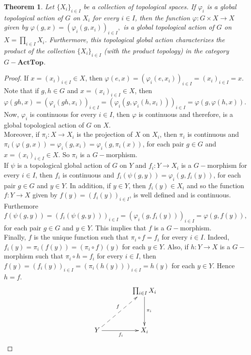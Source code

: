 \documentclass[sn-mathphys-num]{sn-jnl}%
\theoremstyle{thmstyleone}%
\newtheorem{theorem}{Theorem}%
\theoremstyle{thmstyletwo}%
\theoremstyle{thmstylethree}%
\begin{document}
\begin{theorem}\label{proglo}
Let $ \{X_i \}_{i \in I} $ be a collection of topological spaces. If $ \varphi_i $ is a global topological action of $ G $ on $ X_i $ for every $i\in I$, then the function $ \varphi: G \times X \to X $ given by $ \varphi (g, x) = (\varphi_i (g , x_i))_{i \in I},$ is a global topological action of $ G $ on $ X = \prod_{i \in I} X_i $. Furthermore, this topological global action characterizes the product of the collection $ \{X_i \}_{i \in I} $ (with the product topology) in the category $ G- \mathbf{ActTop}$.
\end{theorem}
\begin{proof}
If $ x = (x_i)_{i \in I} \in X $, then $ \varphi (e, x) = (\varphi_i(e, x_i ))_{i \in I} = (x_i)_{ i \in I} = x.$ Note that if $ g, h \in G $ and $ x = (x_i)_{ i \in I} \in X $, then $ \varphi (gh, x) = (\varphi_i (gh, x_i))_{i \in I} = (\varphi_i (g, \varphi_i (h, x_i)))_{i \in I} = \varphi (g, \varphi (h, x)) $.  Now, $\varphi_i$ is continuous for every $ i \in I $, then $ \varphi $ is continuous and therefore, is a global topological action of $ G $ on $ X $. \\

Moreover, if $ \pi_i: X \to X_i $ is the projection of $ X $ on $ X_i $, then $\pi_i$ is continuous and $ \pi_i (\varphi (g, x)) = \varphi_i(g, x_i) = \varphi_i(g, \pi_i (x)) $, for each pair $ g \in G $ and $ x = (x_i)_{i \in I} \in X $. So $ \pi_i $ is a $ G-$morphism. \\

If  $ \psi$ is a topological global action of $G$ on $Y$ and $ f_i: Y \to X_i $ is a $ G-$morphism for every $ i \in I$, then $ f_i $ is continuous and $ f_i (\psi (g, y)) = \varphi_i (g, f_i (y)) $, for each pair $ g \in G $ and $y \in Y $. In addition, if $ y \in Y $, then $ f_i (y) \in X_i $ and so the function $ f: Y \to X $ given by $ f (y) = (f_i (y))_{i \in I} $, is well defined and is continuous. Furthemore $$ f (\psi (g, y)) = (f_i (\psi (g, y)))_{i \in I} = (\varphi_i (g, f_i (y)))_{i \in I} = \varphi (g, f (y)), $$ for each pair $ g \in G $ and $ y \in Y $. This implies that $ f $ is a $ G-$morphism. \\

Finally, $ f $ is the unique function such that $ \pi_i \circ f = f_i $ for every $ i \in I $. Indeed,  $ f_i (y) = \pi_i (f (y)) = (\pi_i \circ f) (y) $ for each $ y \in Y$. Also, if $ h: Y \to X $ is a $ G- $morphism such that $ \pi_i \circ h = f_i $ for every $ i \in I $, then $ f (y) = (f_i (y))_{i \in I} = (\pi_i(h (y)))_{ i \in I} = h (y) $ for each $ y \in Y $. Hence $ h = f $.
$$
\xymatrix@=1.5cm{
 & \prod_{i \in I}X_i\ar[d]^{\pi_i}\\
Y \ar@{-->}[ur]^f \ar[r]_{f_i}&X_i
}
$$
\end{proof}
\end{document}
